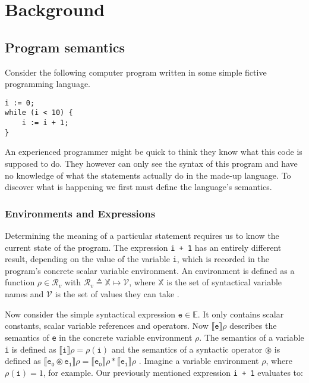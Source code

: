 \chapter{Background}
\section{Program semantics}

Consider the following computer program written in some simple fictive programming language.

\begin{center}
\begin{BVerbatim}
i := 0;
while (i < 10) {
    i := i + 1;
}
\end{BVerbatim}
\end{center}

An experienced programmer might be quick to think they know what this code is supposed to do. They however can only see the syntax of this program and have no knowledge of what the statements actually do in the made-up language. To discover what is happening we first must define the language's semantics. 


\subsection{Environments and Expressions}

Determining the meaning of a particular statement requires us to know the current state of the program. The expression \texttt{i + 1} has an entirely different result, depending on the value of the variable \texttt{i}, which is recorded in the program's concrete scalar variable environment. An environment is defined as a function $\rho\in\mathcal{R}_v$ with $\mathcal{R}_v \triangleq \mathbb{X}\mapsto\mathcal{V}$, where $\mathbb{X}$ is the set of syntactical variable names and $\mathcal{V}$ is the set of values they can take \cite{cousot2011}.

Now consider the simple syntactical expression $\mathtt{e}\in\mathbb{E}$. It only contains scalar constants, scalar variable references and operators. Now $\llbracket\mathtt{e}\rrbracket\rho$ describes the semantics of \texttt{e} in the concrete variable environment $\rho$. The semantics of a variable \texttt{i} is defined as $\llbracket\mathtt{i}\rrbracket\rho=\rho(\mathtt{i})$ and the semantics of a syntactic operator $\circledast$ is defined as $\llbracket\mathtt{e_0\circledast e_1}\rrbracket\rho=\llbracket\mathtt{e_0}\rrbracket\rho \ast\llbracket\mathtt{e_1}\rrbracket\rho$ \cite{scott1971}. 
Imagine a variable environment $\rho$, where $\rho(\mathtt{i})=1$, for example. Our previously mentioned expression \texttt{i + 1} evaluates to:

